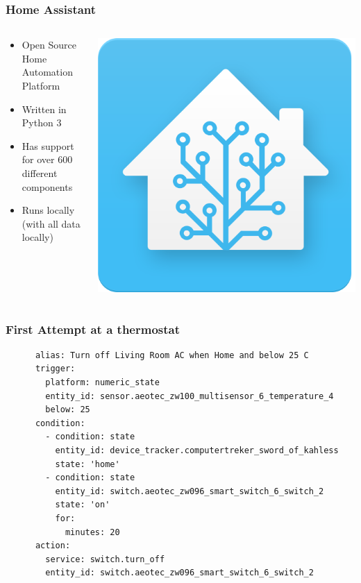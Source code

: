 \documentclass[aspectratio=169,11pt,hyperref={colorlinks=true}]{beamer}
\begin{document}
\begin{frame}
    \frametitle{Home Assistant}
    \begin{columns}
        \begin{column}{.48\textwidth}
            \begin{itemize}
                \item Open Source Home Automation Platform
                \item Written in Python 3
                \item Has support for over 600 different components
                \item Runs locally (with all data locally)
            \end{itemize}
        \end{column}
        \begin{column}{.48\textwidth}
            \includegraphics[width=\textwidth]{homeassistant.png}
        \end{column}
    \end{columns}
\end{frame}

\begin{frame}[fragile=singleslide]
    \frametitle{First Attempt at a thermostat}
    \begin{verbatim}
      alias: Turn off Living Room AC when Home and below 25 C
      trigger:
        platform: numeric_state
        entity_id: sensor.aeotec_zw100_multisensor_6_temperature_4
        below: 25
      condition:
        - condition: state
          entity_id: device_tracker.computertreker_sword_of_kahless
          state: 'home'
        - condition: state
          entity_id: switch.aeotec_zw096_smart_switch_6_switch_2
          state: 'on'
          for:
            minutes: 20
      action:
        service: switch.turn_off
        entity_id: switch.aeotec_zw096_smart_switch_6_switch_2
    \end{verbatim}
\end{frame}
\end{document}
